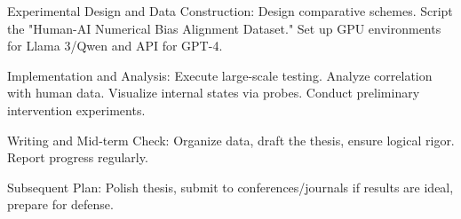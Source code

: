 Experimental Design and Data Construction: Design comparative schemes. Script the "Human-AI Numerical Bias Alignment Dataset." Set up GPU environments for Llama 3/Qwen and API for GPT-4.

Implementation and Analysis: Execute large-scale testing. Analyze correlation with human data. Visualize internal states via probes. Conduct preliminary intervention experiments.

Writing and Mid-term Check: Organize data, draft the thesis, ensure logical rigor. Report progress regularly.

Subsequent Plan: Polish thesis, submit to conferences/journals if results are ideal, prepare for defense.
